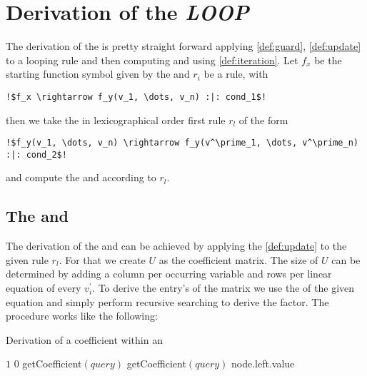 \section{Derivation of the \emph{LOOP}}
\label{sec:loop}
The derivation of the \loopt is pretty straight forward applying \autoref{def:guard}, \autoref{def:update} to a looping rule and then computing \iterationmatrix and \iterationconstants using \autoref{def:iteration}. \newline
Let $f_x$ be the starting function symbol given by the \its and $r_i$ be a rule, with 
\begin{lstlisting}[escapechar=!]
	!$f_x \rightarrow f_y(v_1, \dots, v_n) :|: cond_1$!
\end{lstlisting} 
then we take the in lexicographical order first rule $r_l$ of the form 
\begin{lstlisting}[escapechar=!]
	!$f_y(v_1, \dots, v_n) \rightarrow f_y(v^\prime_1, \dots, v^\prime_n) :|: cond_2$!
\end{lstlisting}
and compute the \iterationmatrix and \iterationconstants according to $r_l$. 

\subsection{The \updatematrix and \updateconstants}
\label{sec:derivation-update}
The derivation of the \updatematrix and \updateconstants can be achieved by applying the \autoref{def:update} to the given rule $r_l$. For that we create $U$ as the coefficient matrix. The size of $U$ can be determined by adding a column per occurring variable and rows per linear equation of every $v^\prime_i$. To derive the entry's of the matrix we use the \rpntree of the given equation and simply perform recursive searching to derive the factor. 
The procedure works like the following:
\begin{algorithm}[H]
	\caption{Derivation of a coefficient within an \rpntree}
	\label{algo:coefficient}
	\begin{algorithmic}[1]
				\State \Return $1$
			 
				\State \Return $0$
			\EndIf
			\State
			 
					\State \Return getCoefficient$(query)$
				\Else
					\State \Return getCoefficient$(query)$
				\EndIf
			\EndIf
			 
					\State \Return node.left.value
				\EndIf				
			\EndIf
		\EndFunction
	\end{algorithmic}
\end{algorithm}

